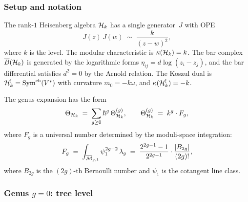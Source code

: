 \subsubsection{Setup and notation}
\label{subsubsec:thqg-VII-heis-setup}

The rank-$1$ Heisenberg algebra $\mathcal{H}_k$ has a single generator~$J$
with OPE
\begin{equation}\label{eq:thqg-VII-heis-ope}
J(z)\,J(w) \;\sim\; \frac{k}{(z-w)^2},
\end{equation}
where $k$ is the level. The modular characteristic is
$\kappa(\mathcal{H}_k) = k$. The bar complex $\overline{B}(\mathcal{H}_k)$ is
generated by the logarithmic forms
$\eta_{ij} = d\log(z_i - z_j)$, and the bar differential satisfies
$d^2 = 0$ by the Arnold relation. The Koszul dual is
$\mathcal{H}_k^! = \mathrm{Sym}^{\mathrm{ch}}(V^*)$ with curvature
$m_0 = -k\omega$, and $\kappa(\mathcal{H}_k^!) = -k$.

The genus expansion has the form
\begin{equation}\label{eq:thqg-VII-heis-genus-exp}
\Theta_{\mathcal{H}_k}
\;=\;
\sum_{g \geq 0} \hbar^g\,\Theta^{(g)}_{\mathcal{H}_k},
\qquad
\Theta^{(g)}_{\mathcal{H}_k}
\;=\;
k^g \cdot F_g,
\end{equation}
where $F_g$ is a universal number determined by the moduli-space
integration:
\begin{equation}\label{eq:thqg-VII-heis-Fg}
F_g
\;=\;
\int_{\overline{\mathcal{M}}_{g,1}} \psi_1^{2g-2}\,\lambda_g
\;=\;
\frac{2^{2g-1} - 1}{2^{2g-1}}
\cdot
\frac{|B_{2g}|}{(2g)!},
\end{equation}
where $B_{2g}$ is the $(2g)$-th Bernoulli number and
$\psi_1$ is the cotangent line class.

\subsubsection{Genus $g = 0$: tree level}
\label{subsubsec:thqg-VII-heis-g0}

